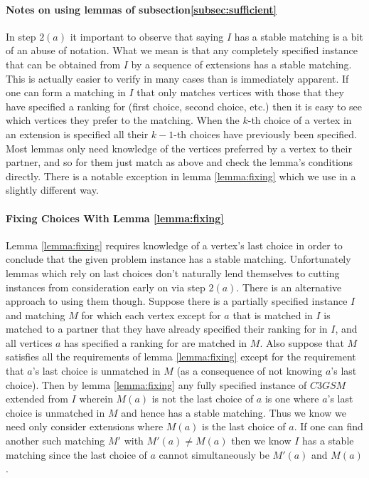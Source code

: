 \paragraph{Notes on using lemmas of subsection\ref{subsec:sufficient}}
In step $2(a)$ it important to observe that saying $I$ has a stable matching is a bit of an abuse of notation. What we mean is that any completely specified instance that can be obtained from $I$ by a sequence of extensions has a stable matching. This is actually easier to verify in many cases than is immediately apparent. If one can form a matching in $I$ that only matches vertices with those that they have specified a ranking for (first choice, second choice, etc.) then it is easy to see which vertices they prefer to the matching. When the $k$-th choice of a vertex in an extension is specified all their $k-1$-th choices have previously been specified. Most lemmas only need knowledge of the vertices preferred by a vertex to their partner, and so for them just match as above and check the lemma's conditions directly. There is a notable exception in lemma \ref{lemma:fixing} which we use in a slightly different way.
\paragraph{Fixing Choices With Lemma \ref{lemma:fixing}}
Lemma \ref{lemma:fixing} requires knowledge of a vertex's last choice in order to conclude that the given problem instance has a stable matching. Unfortunately lemmas which rely on last choices don't naturally lend themselves to cutting instances from consideration early on via step $2(a)$. There is an alternative approach to using them though. Suppose there is a partially specified instance $I$ and matching $M$ for which each vertex except for $a$ that is matched in $I$ is matched to a partner that they have already specified their ranking for in $I$, and all vertices $a$ has specified a ranking for are matched in $M$. Also suppose that $M$ satisfies all the requirements of lemma \ref{lemma:fixing} except for the requirement that $a$'s last choice is unmatched in $M$ (as a consequence of not knowing $a$'s last choice). Then by lemma \ref{lemma:fixing} any fully specified instance of $C3GSM$ extended from $I$ wherein $M(a)$ is not the last choice of $a$ is one where $a$'s last choice is unmatched in $M$ and hence has a stable matching. Thus we know we need only consider extensions where $M(a)$ is the last choice of $a$. If one can find another such matching $M'$ with $M'(a) \neq M(a)$ then we know $I$ has a stable matching since the last choice of $a$ cannot simultaneously be $M'(a)$ and $M(a)$.
